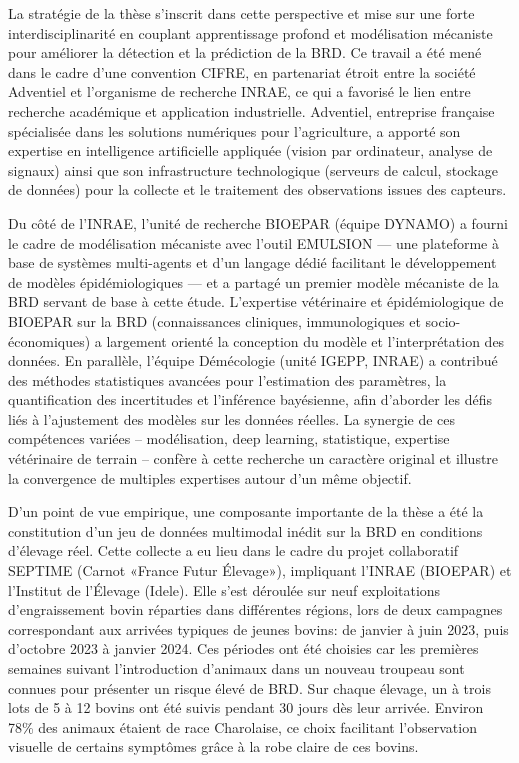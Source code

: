 La stratégie de la thèse s’inscrit dans cette perspective et mise sur une forte interdisciplinarité en couplant apprentissage profond et modélisation mécaniste pour améliorer la détection et la prédiction de la BRD. Ce travail a été mené dans le cadre d’une convention CIFRE, en partenariat étroit entre la société Adventiel et l’organisme de recherche INRAE, ce qui a favorisé le lien entre recherche académique et application industrielle. Adventiel, entreprise française spécialisée dans les solutions numériques pour l’agriculture, a apporté son expertise en intelligence artificielle appliquée (vision par ordinateur, analyse de signaux) ainsi que son infrastructure technologique (serveurs de calcul, stockage de données) pour la collecte et le traitement des observations issues des capteurs. 

Du côté de l’INRAE, l’unité de recherche BIOEPAR (équipe DYNAMO) a fourni le cadre de modélisation mécaniste avec l’outil EMULSION — une plateforme à base de systèmes multi-agents et d’un langage dédié facilitant le développement de modèles épidémiologiques — et a partagé un premier modèle mécaniste de la BRD servant de base à cette étude. L’expertise vétérinaire et épidémiologique de BIOEPAR sur la BRD (connaissances cliniques, immunologiques et socio-économiques) a largement orienté la conception du modèle et l’interprétation des données. En parallèle, l’équipe Démécologie (unité IGEPP, INRAE) a contribué des méthodes statistiques avancées pour l’estimation des paramètres, la quantification des incertitudes et l’inférence bayésienne, afin d’aborder les défis liés à l’ajustement des modèles sur les données réelles. La synergie de ces compétences variées – modélisation, deep learning, statistique, expertise vétérinaire de terrain – confère à cette recherche un caractère original et illustre la convergence de multiples expertises autour d’un même objectif. 

D’un point de vue empirique, une composante importante de la thèse a été la constitution d’un jeu de données multimodal inédit sur la BRD en conditions d’élevage réel. Cette collecte a eu lieu dans le cadre du projet collaboratif SEPTIME (Carnot «France Futur Élevage»), impliquant l’INRAE (BIOEPAR) et l’Institut de l’Élevage (Idele). Elle s’est déroulée sur neuf exploitations d’engraissement bovin réparties dans différentes régions, lors de deux campagnes correspondant aux arrivées typiques de jeunes bovins: de janvier à juin 2023, puis d’octobre 2023 à janvier 2024. Ces périodes ont été choisies car les premières semaines suivant l’introduction d’animaux dans un nouveau troupeau sont connues pour présenter un risque élevé de BRD. Sur chaque élevage, un à trois lots de 5 à 12 bovins ont été suivis pendant 30 jours dès leur arrivée. Environ 78\% des animaux étaient de race Charolaise, ce choix facilitant l’observation visuelle de certains symptômes grâce à la robe claire de ces bovins.

